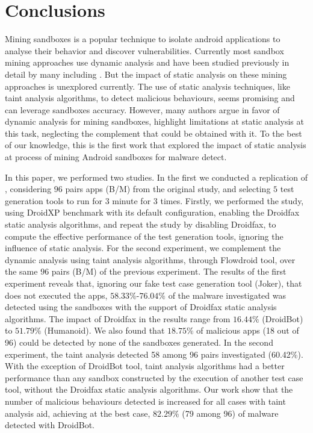\section{Conclusions}

Mining sandboxes is a popular technique to isolate android applications to analyse their behavior and discover vulnerabilities. Currently most sandbox mining approaches use dynamic analysis and have been studied previously in detail by many including \blls. But the impact of static analysis on these mining approaches is unexplored currently. The use of static analysis techniques, like taint analysis algorithms, to detect malicious behaviours, seems promising and can leverage sandboxes accuracy. However, many authors argue in favor of dynamic analysis for  mining sandboxes, highlight limitations at static analysis at this task, neglecting the complement that could be obtained with it. To the best of our knowledge, this is the first work that explored the impact of static analysis at process of mining Android sandboxes for malware detect.

In this paper, we performed two studies. In the first we conducted a replication of \blls, considering $96$ pairs apps (B/M) from the original study, and selecting $5$ test generation tools to run for $3$ minute for $3$ times. Firstly, we performed the study, using DroidXP benchmark with its default configuration, enabling the Droidfax static analysis algorithms, and repeat the study by disabling Droidfax, to compute the effective performance of the test generation tools, ignoring the influence of static analysis. For the second experiment, we complement the dynamic analysis using taint analysis algorithms, through Flowdroid tool, over the same $96$ pairs (B/M) of the previous experiment. The results of the first experiment reveals that, ignoring our fake test case generation tool (Joker), that does not executed the apps, $58.33\%$-$76.04\%$ of the malware investigated was detected using the sandboxes with the support of Droidfax static analysis algorithms. The impact of Droidfax in the results range from $16.44\%$ (DroidBot) to $51.79\%$ (Humanoid). We also found that $18.75\%$ of malicious apps (18 out of 96) could be detected by none of the sandboxes generated. In the second experiment, the taint analysis detected 58 among 96 pairs investigated (60.42\%). With the exception of DroidBot tool, taint analysis algorithms had a better performance than any sandbox constructed by the execution of another test case tool, without the Droidfax static analysis algorithms. Our work show that the number of malicious behaviours detected is increased for all cases with taint analysis aid, achieving at the best case, $82.29\%$ (79 among 96) of malware detected with DroidBot.

